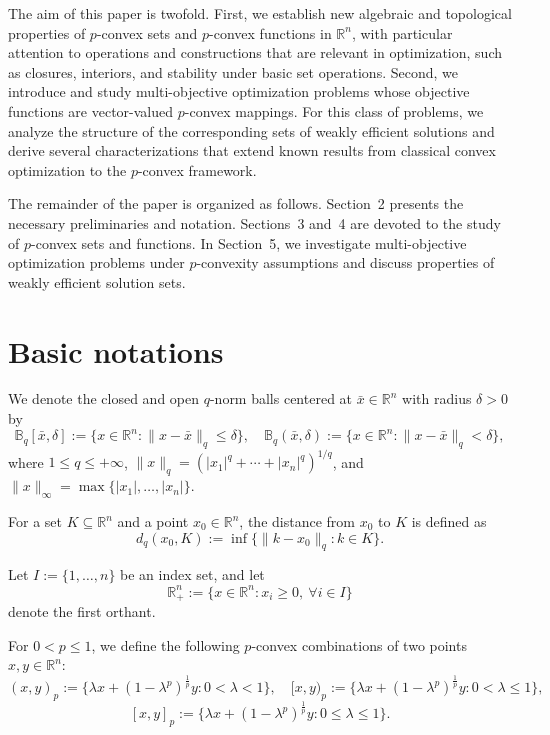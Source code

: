 \documentclass[10pt]{article}
\begin{document}
The aim of this paper is twofold. First, we establish new algebraic and topological properties of $p$-convex sets and $p$-convex functions in $\mathbb{R}^n$, with particular attention to operations and constructions that are relevant in optimization, such as closures, interiors, and stability under basic set operations. Second, we introduce and study multi-objective optimization problems whose objective functions are vector-valued $p$-convex mappings. For this class of problems, we analyze the structure of the corresponding sets of weakly efficient solutions and derive several characterizations that extend known results from classical convex optimization to the $p$-convex framework.

The remainder of the paper is organized as follows. Section~2 presents the necessary preliminaries and notation. Sections~3 and~4 are devoted to the study of $p$-convex sets and functions. In Section~5, we investigate multi-objective optimization problems under $p$-convexity assumptions and discuss properties of weakly efficient solution sets.

\section{Basic notations}
\label{sec:2}
We denote the closed and open $q$-norm balls centered at $\bar{x} \in \mathbb{R}^n$ with radius $\delta > 0$ by
\[
\mathbb{B}_{q}[\bar{x},\delta] := \{x \in \mathbb{R}^n : \|x - \bar{x}\|_q \leq \delta\}, \quad
\mathbb{B}_{q}(\bar{x},\delta) := \{x \in \mathbb{R}^n : \|x - \bar{x}\|_q < \delta\},
\]
where $1 \leq q \leq +\infty$, $\|x\|_q = (|x_1|^q + \cdots + |x_n|^q)^{1/q}$, and $\|x\|_\infty = \max\{|x_1|, \dots, |x_n|\}$. 

For a set $K \subseteq \mathbb{R}^n$ and a point $x_0 \in \mathbb{R}^n$, the distance from $x_0$ to $K$ is defined as
\[
d_{q}(x_0, K) := \inf\{\|k - x_0\|_q : k \in K\}.
\]

Let $I := \{1, \dots, n\}$ be an index set, and let 
\[
\mathbb{R}^n_+ := \{x \in \mathbb{R}^n : x_i \ge 0, \ \forall i \in I\}
\]
denote the first orthant. 

For $0 < p \leq 1$, we define the following $p$-convex combinations of two points $x, y \in \mathbb{R}^n$:
\[
(x, y)_p := \{\lambda x + (1 - \lambda^p)^{\frac{1}{p}} y : 0 < \lambda < 1\}, \quad
[x, y)_p := \{\lambda x + (1 - \lambda^p)^{\frac{1}{p}} y : 0 < \lambda \le 1\},\]
\[ [x, y]_p := \{\lambda x + (1 - \lambda^p)^{\frac{1}{p}} y : 0 \le \lambda \le 1\}.
\]
\end{document}

